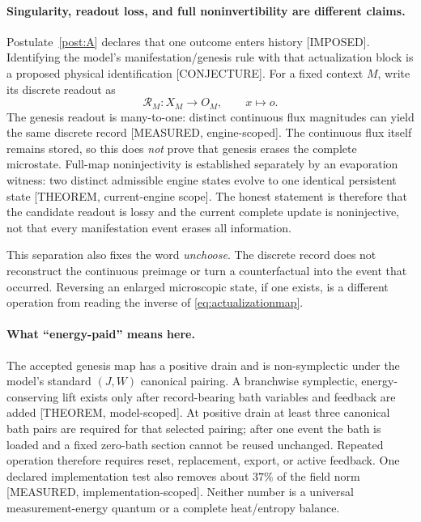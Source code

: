 \documentclass[11pt,a4paper]{article}
\theoremstyle{definition}
\theoremstyle{plain}
\theoremstyle{remark}
\begin{document}
\paragraph{Singularity, readout loss, and full noninvertibility are
different claims.} Postulate~\ref{post:A} declares that one outcome enters
history [IMPOSED]. Identifying the model's manifestation/genesis rule with
that actualization block is a proposed physical identification
[CONJECTURE]. For a fixed context $M$, write its discrete readout as
\begin{equation}
  \mathcal R_M:X_M\longrightarrow O_M,
  \qquad x\longmapsto o.
  \label{eq:actualizationmap}
\end{equation}
The genesis readout is many-to-one: distinct continuous flux magnitudes can
yield the same discrete record [MEASURED, engine-scoped]. The continuous
flux itself remains stored, so this does \emph{not} prove that genesis
erases the complete microstate. Full-map noninjectivity is established
separately by an evaporation witness: two distinct admissible engine states
evolve to one identical persistent state [THEOREM, current-engine scope].
The honest statement is therefore that the candidate readout is lossy and
the current complete update is noninjective, not that every manifestation
event erases all information.

This separation also fixes the word \emph{unchoose}. The discrete record
does not reconstruct the continuous preimage or turn a counterfactual into
the event that occurred. Reversing an enlarged microscopic state, if one
exists, is a different operation from reading the inverse of
\eqref{eq:actualizationmap}.

\paragraph{What ``energy-paid'' means here.} The accepted genesis map has a
positive drain and is non-symplectic under the model's standard $(J,W)$
canonical pairing. A branchwise symplectic, energy-conserving lift exists
only after record-bearing bath variables and feedback are added
[THEOREM, model-scoped]. At positive drain at least three canonical bath
pairs are required for that selected pairing; after one event the bath is
loaded and a fixed zero-bath section cannot be reused unchanged. Repeated
operation therefore requires reset, replacement, export, or active
feedback. One declared implementation test also removes about $37\%$ of
the field norm [MEASURED, implementation-scoped]. Neither number is a
universal measurement-energy quantum or a complete heat/entropy balance.
\end{document}
